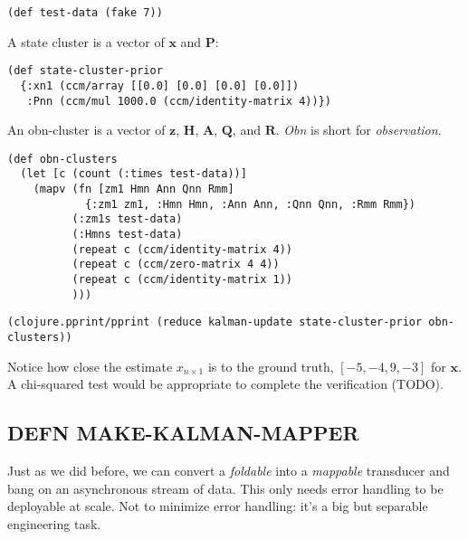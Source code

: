 \documentclass[10pt,oneside,x11names]{article}
\begin{document}
\begin{verbatim}
(def test-data (fake 7))
\end{verbatim}

A state cluster is a vector of \(\boldsymbol{x}\) and \(\boldsymbol{P}\):

\begin{verbatim}
(def state-cluster-prior
  {:xn1 (ccm/array [[0.0] [0.0] [0.0] [0.0]])
   :Pnn (ccm/mul 1000.0 (ccm/identity-matrix 4))})
\end{verbatim}

An obn-cluster is a vector of \(\boldsymbol{z}\), \(\boldsymbol{H}\),
\(\boldsymbol{A}\), \(\boldsymbol{Q}\), and \(\boldsymbol{R}\). \emph{Obn} is short
for \emph{observation}.

\begin{verbatim}
(def obn-clusters
  (let [c (count (:times test-data))]
    (mapv (fn [zm1 Hmn Ann Qnn Rmm]
            {:zm1 zm1, :Hmn Hmn, :Ann Ann, :Qnn Qnn, :Rmm Rmm})
          (:zm1s test-data)
          (:Hmns test-data)
          (repeat c (ccm/identity-matrix 4))
          (repeat c (ccm/zero-matrix 4 4))
          (repeat c (ccm/identity-matrix 1))
          )))
\end{verbatim}

\begin{verbatim}
(clojure.pprint/pprint (reduce kalman-update state-cluster-prior obn-clusters))
\end{verbatim}

Notice how close the estimate \(x_{n\times{1}}\) is to the ground truth, \([-5, -4,
9, -3]\) for \(\boldsymbol{x}\). A chi-squared test would be appropriate to
complete the verification (TODO).

\subsection{DEFN MAKE-KALMAN-MAPPER}
\label{make-kalman-mapper}
Just as we did before, we can convert a \emph{foldable} into a \emph{mappable}
transducer and bang on an asynchronous stream of data. This only needs
error handling to be deployable at scale. Not to minimize error
handling: it's a big but separable engineering task.
\end{document}
